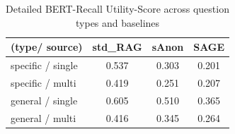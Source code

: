 \begin{table}[h!]
\centering
\caption{Detailed BERT-Recall Utility-Score across question types and baselines}
\label{evaluation-tab:utility-bert-details}
\begin{tabular}{l c c c}
\toprule
\textbf{(type/ source)} & \textbf{std\_RAG} & \textbf{sAnon} & \textbf{SAGE} \\
\midrule
specific / single & 0.537 & 0.303 & 0.201 \\
specific / multi & 0.419 & 0.251 & 0.207 \\
general / single & 0.605 & 0.510 & 0.365 \\
general / multi & 0.416 & 0.345 & 0.264 \\
\bottomrule
\end{tabular}
\end{table}